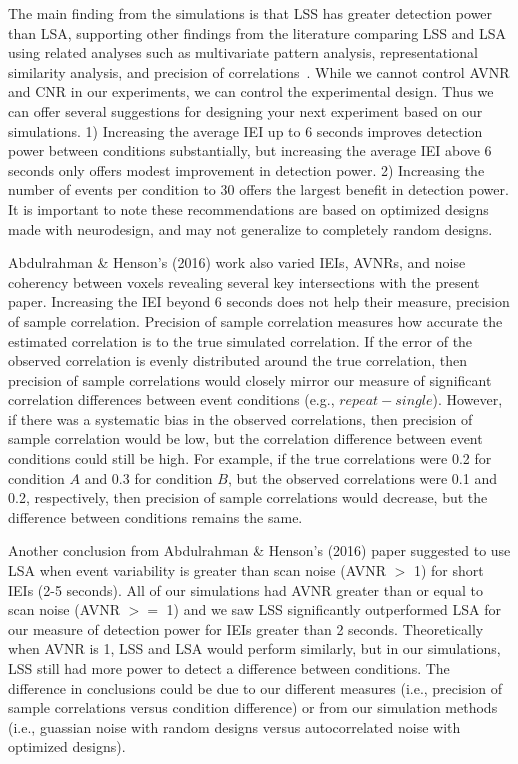 \documentclass[10pt,letterpaper]{article}
\begin{document}
The main finding from the simulations is that LSS has greater detection power than LSA,
supporting other findings from the literature comparing LSS and LSA using related analyses such as
multivariate pattern analysis, representational similarity analysis, and precision of correlations~\cite{Mumford2012,Mumford2014a,Abdulrahman2016,Turner2012a}.
While we cannot control AVNR and CNR in our experiments, we can control the experimental design.
Thus we can offer several suggestions for designing your next experiment based on our simulations.
1) Increasing the average IEI up to 6 seconds improves detection power between conditions substantially,
but increasing the average IEI above 6 seconds only offers modest improvement in detection power.
2) Increasing the number of events per condition to 30 offers the largest benefit in detection power.
It is important to note these recommendations are based on optimized designs made with neurodesign,
and may not generalize to completely random designs.

Abdulrahman \& Henson's (2016) work also varied IEIs, AVNRs, and noise coherency between voxels
revealing several key intersections with the present paper.
Increasing the IEI beyond 6 seconds does not help their measure, precision of sample correlation.
Precision of sample correlation measures how accurate the estimated correlation is to the true
simulated correlation.
If the error of the observed correlation is evenly distributed around the
true correlation, then precision of sample correlations would closely mirror our measure of
significant correlation differences between event conditions (e.g., $repeat - single$).
However, if there was a systematic bias in the observed correlations, then precision of sample correlation
would be low, but the correlation difference between event conditions could still be high.
For example, if the true correlations were 0.2 for condition $A$ and 0.3 for condition $B$, but
the observed correlations were 0.1 and 0.2, respectively, then precision of sample correlations would
decrease, but the difference between conditions remains the same.

Another conclusion from Abdulrahman \& Henson's (2016)\cite{Abdulrahman2016} paper suggested to
use LSA when event variability is greater than scan noise (AVNR $>$ 1) for short IEIs (2-5 seconds).
All of our simulations had AVNR greater than or equal to scan noise (AVNR $>=$ 1) and we saw
LSS significantly outperformed LSA for our measure of detection power for IEIs greater than 2 seconds.
Theoretically when AVNR is 1, LSS and LSA would perform similarly, but in our simulations,
LSS still had more power to detect a difference between conditions.
The difference in conclusions could be due to our different measures (i.e., precision of sample correlations versus condition difference)
or from our simulation methods (i.e., guassian noise with random designs versus autocorrelated noise with optimized designs).
\end{document}
